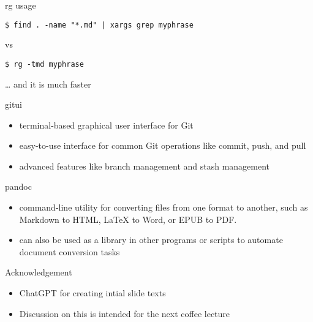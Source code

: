 \documentclass[
  10pt,
  ignorenonframetext,
]{beamer}
\providecommand{\tightlist}{%
  \setlength{\itemsep}{0pt}\setlength{\parskip}{0pt}}
\begin{document}
\begin{frame}[fragile]{rg usage}
\protect\hypertarget{rg-usage}{}
\begin{verbatim}
$ find . -name "*.md" | xargs grep myphrase
\end{verbatim}

vs

\begin{verbatim}
$ rg -tmd myphrase
\end{verbatim}

\ldots{} and it is much faster
\end{frame}

\begin{frame}{gitui}
\protect\hypertarget{gitui}{}
\begin{itemize}
\tightlist
\item
  terminal-based graphical user interface for Git
\item
  easy-to-use interface for common Git operations like commit, push, and
  pull
\item
  advanced features like branch management and stash management
\end{itemize}
\end{frame}

\begin{frame}{pandoc}
\protect\hypertarget{pandoc}{}
\begin{itemize}
\tightlist
\item
  command-line utility for converting files from one format to another,
  such as Markdown to HTML, LaTeX to Word, or EPUB to PDF.
\item
  can also be used as a library in other programs or scripts to automate
  document conversion tasks
\end{itemize}
\end{frame}

\begin{frame}{Acknowledgement}
\protect\hypertarget{acknowledgement}{}
\begin{itemize}
\tightlist
\item
  ChatGPT for creating intial slide texts
\item
  Discussion on this is intended for the next coffee lecture
\end{itemize}
\end{frame}
\end{document}

